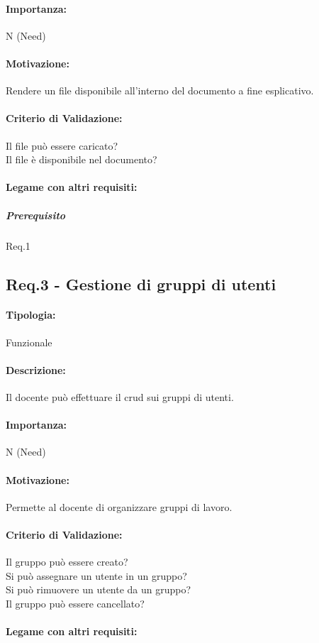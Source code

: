 \paragraph{Importanza:}
	N (Need)
\paragraph{Motivazione:}
	Rendere un file disponibile all'interno del documento a fine esplicativo.
\paragraph{Criterio di Validazione:}
	Il file può essere caricato?\\
	Il file è disponibile nel documento?
\paragraph{Legame con altri requisiti:}
	\subparagraph{Prerequisito} Req.1


\subsection{Req.3 - Gestione di gruppi di utenti}
\paragraph{Tipologia:}
	Funzionale
\paragraph{Descrizione:}
	Il docente può effettuare il \gls{crud} sui gruppi di utenti.
\paragraph{Importanza:}
	N (Need)
\paragraph{Motivazione:}
	Permette al docente di organizzare gruppi di lavoro.
\paragraph{Criterio di Validazione:}
	Il gruppo può essere creato?\\
	Si può assegnare un utente in un gruppo?\\
	Si può rimuovere un utente da un gruppo?\\
	Il gruppo può essere cancellato?
\paragraph{Legame con altri requisiti:}



